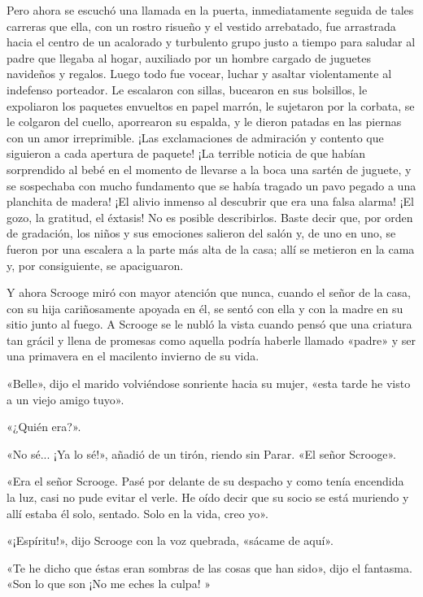 \documentclass{novela}
\begin{document}
 Pero ahora se escuchó una llamada en la puerta, inmediatamente seguida de tales carreras que ella, con un rostro risueño y el vestido arrebatado, fue arrastrada hacia el centro de un acalorado y turbulento grupo justo a tiempo para saludar al padre que llegaba al hogar, auxiliado por un hombre cargado de juguetes navideños y regalos. Luego todo fue vocear, luchar y asaltar violentamente al indefenso porteador. Le escalaron con sillas, bucearon en sus bolsillos, le expoliaron los paquetes envueltos en papel marrón, le sujetaron por la corbata, se le colgaron del cuello, aporrearon su espalda, y le dieron patadas en las piernas con un amor irreprimible. ¡Las exclamaciones de admiración y contento que siguieron a cada apertura de paquete! ¡La terrible noticia de que habían sorprendido al bebé en el momento de llevarse a la boca una sartén de juguete, y se sospechaba con mucho fundamento que se había tragado un pavo pegado a una planchita de madera! ¡El alivio inmenso al descubrir que era una falsa alarma! ¡El gozo, la gratitud, el éxtasis! No es posible describirlos. Baste decir que, por orden de gradación, los niños y sus emociones salieron del salón y, de uno en uno, se fueron por una escalera a la parte más alta de la casa; allí se metieron en la cama y, por consiguiente, se apaciguaron.

 Y ahora Scrooge miró con mayor atención que nunca, cuando el señor de la casa, con su hija cariñosamente apoyada en él, se sentó con ella y con la madre en su sitio junto al fuego. A Scrooge se le nubló la vista cuando pensó que una criatura tan grácil y llena de promesas como aquella podría haberle llamado «padre» y ser una primavera en el macilento invierno de su vida.

 «Belle», dijo el marido volviéndose sonriente hacia su mujer, «esta tarde he visto a un viejo amigo tuyo».

 «¿Quién era?».

 «No sé... ¡Ya lo sé!», añadió de un tirón, riendo sin Parar. «El señor Scrooge».

 «Era el señor Scrooge. Pasé por delante de su despacho y como tenía encendida la luz, casi no pude evitar el verle. He oído decir que su socio se está muriendo y allí estaba él solo, sentado. Solo en la vida, creo yo».

 «¡Espíritu!», dijo Scrooge con la voz quebrada, «sácame de aquí».

 «Te he dicho que éstas eran sombras de las cosas que han sido», dijo el fantasma. «Son lo que son ¡No me eches la culpa! »
\end{document}
